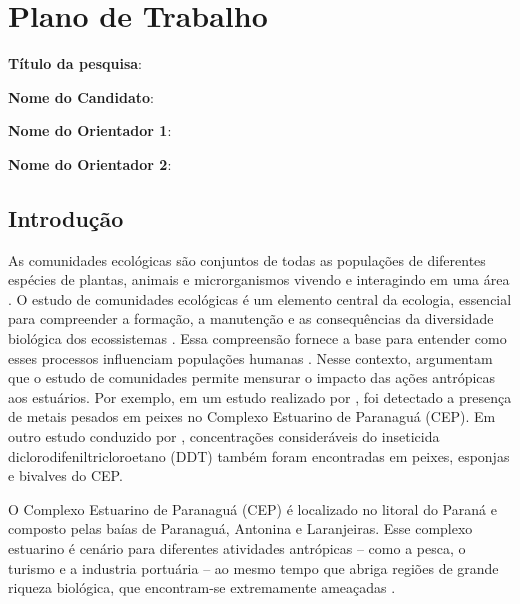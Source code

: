 \documentclass[
	12pt,				%
	openright,			%
	twoside,			%
	a4paper,			%
	english,			%
	french,				%
	spanish,			%
	brazilian,				%
	]{abntex2}
\begin{document}
\frenchspacing 


\textual

\chapter{Plano de Trabalho}

\noindent \textbf{Título da pesquisa}: \imprimirtitulo

\noindent \textbf{Nome do Candidato}: \imprimirautor

\noindent \textbf{Nome do Orientador 1}: \imprimirorientador

\noindent \textbf{Nome do Orientador 2}: \imprimircoorientador

\section{Introdução}

As comunidades ecológicas são conjuntos de todas as populações de diferentes espécies de plantas, animais e microrganismos vivendo e interagindo em uma área \cite[p.~39]{miller_ciencia_2021}. O estudo de comunidades ecológicas é um elemento central da ecologia, essencial para compreender a formação, a manutenção e as consequências da diversidade biológica dos ecossistemas \cite[p.~3]{morin_community_2011}. Essa compreensão fornece a base para entender como esses processos influenciam populações humanas \cite[p.~4]{morin_community_2011}. Nesse contexto,  argumentam que o estudo de comunidades permite mensurar o impacto das ações antrópicas aos estuários. Por exemplo, em um estudo realizado por , foi detectado a presença de metais pesados em peixes no Complexo Estuarino de Paranaguá (CEP). Em outro estudo conduzido por , concentrações consideráveis do inseticida diclorodifeniltricloroetano (DDT) também foram encontradas em peixes, esponjas e bivalves do CEP.

O Complexo Estuarino de Paranaguá (CEP) é localizado no litoral do Paraná e composto pelas baías de Paranaguá, Antonina e Laranjeiras. Esse complexo estuarino é cenário para diferentes atividades antrópicas  -- como a pesca, o turismo e a industria portuária -- ao mesmo tempo que abriga regiões de grande riqueza biológica, que encontram-se extremamente ameaçadas \cite{miura_mapping_2020}.
\end{document}
